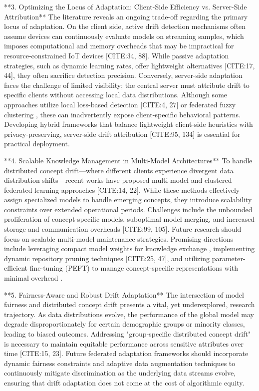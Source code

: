 \documentclass[journal]{IEEEtran}
\begin{document}
**3. Optimizing the Locus of Adaptation: Client-Side Efficiency vs. Server-Side Attribution**
The literature reveals an ongoing trade-off regarding the primary locus of adaptation. On the client side, active drift detection mechanisms often assume devices can continuously evaluate models on streaming samples, which imposes computational and memory overheads that may be impractical for resource-constrained IoT devices [CITE:34, 88]. While passive adaptation strategies, such as dynamic learning rates, offer lightweight alternatives [CITE:17, 44], they often sacrifice detection precision. Conversely, server-side adaptation faces the challenge of limited visibility; the central server must attribute drift to specific clients without accessing local data distributions. Although some approaches utilize local loss-based detection [CITE:4, 27] or federated fuzzy clustering \cite{Stallmann2024}, these can inadvertently expose client-specific behavioral patterns. Developing hybrid frameworks that balance lightweight client-side heuristics with privacy-preserving, server-side drift attribution [CITE:95, 134] is essential for practical deployment.

**4. Scalable Knowledge Management in Multi-Model Architectures**
To handle distributed concept drift—where different clients experience divergent data distribution shifts—recent works have proposed multi-model and clustered federated learning approaches [CITE:14, 22]. While these methods effectively assign specialized models to handle emerging concepts, they introduce scalability constraints over extended operational periods. Challenges include the unbounded proliferation of concept-specific models, suboptimal model merging, and increased storage and communication overheads [CITE:99, 105]. Future research should focus on scalable multi-model maintenance strategies. Promising directions include leveraging compact model weights for knowledge exchange \cite{Luopan2025}, implementing dynamic repository pruning techniques [CITE:25, 47], and utilizing parameter-efficient fine-tuning (PEFT) to manage concept-specific representations with minimal overhead \cite{paper142}.

**5. Fairness-Aware and Robust Drift Adaptation**
The intersection of model fairness and distributed concept drift presents a vital, yet underexplored, research trajectory. As data distributions evolve, the performance of the global model may degrade disproportionately for certain demographic groups or minority classes, leading to biased outcomes. Addressing "group-specific distributed concept drift" is necessary to maintain equitable performance across sensitive attributes over time [CITE:15, 23]. Future federated adaptation frameworks should incorporate dynamic fairness constraints and adaptive data augmentation techniques \cite{Badar2023} to continuously mitigate discrimination as the underlying data streams evolve, ensuring that drift adaptation does not come at the cost of algorithmic equity.
\end{document}
